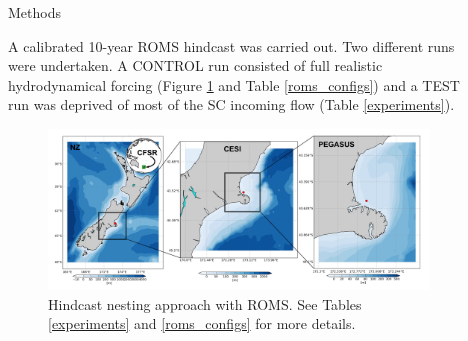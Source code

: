 \documentclass[final]{beamer}
\newlength{\sepwid}
\newlength{\onecolwid}
\newlength{\twocolwid}
\begin{document}
\begin{frame}[t]
\begin{columns}[t]
\begin{column}{\onecolwid}
\end{column} %

\begin{column}{\sepwid}\end{column} %

\begin{column}{\twocolwid} %

    \begin{columns}[t,totalwidth=\twocolwid] %

        \begin{column}{\onecolwid}\vspace{-.6in} %


            \begin{block}{Methods}

            A calibrated 10-year ROMS hindcast was carried out. Two different runs were undertaken. A CONTROL run consisted of full realistic hydrodynamical forcing (Figure \ref{domains} and Table \ref{roms_configs}) and a TEST run was deprived of most of the SC incoming flow (Table \ref{experiments}).  

            \begin{figure}
            \includegraphics[width=0.9\linewidth]{domains.png}
            \caption{\label{domains} Hindcast nesting approach with ROMS. See Tables \ref{experiments} and \ref{roms_configs} for more details.}
            \end{figure}

            \begin{small}


\end{small}
\end{block}
\end{column}
\end{columns}
\end{column}
\end{columns}
\end{frame}
\end{document}

